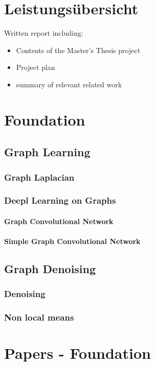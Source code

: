 \chapter{Leistungsübersicht}
Written report including: 
\begin{itemize}
    \item Contents of the Master's Thesis project
    \item Project plan
    \item summary of relevant related work
\end{itemize}

\chapter{Foundation}
\section{Graph Learning}

\subsection{Graph Laplacian}
\subsection{Deepl Learning on Graphs}
\subsubsection{Graph Convolutional Network}
\subsubsection{Simple Graph Convolutional Network}

\section{Graph Denoising}
\subsection{Denoising}
\subsection{Non local means}



\chapter{Papers - Foundation}

